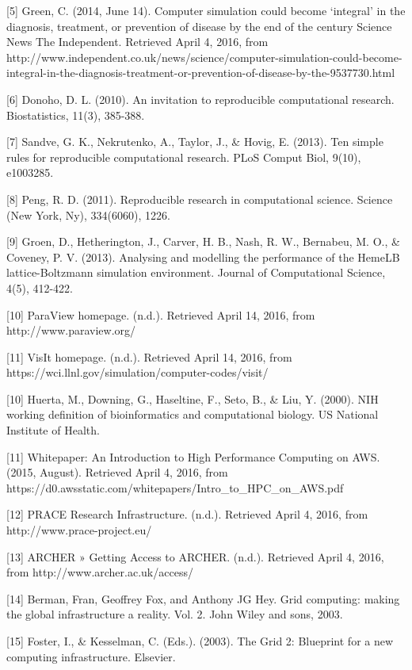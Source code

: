 \documentclass[]{article}
\begin{document}
{[}5{]} Green, C. (2014, June 14). Computer simulation could become
`integral' in the diagnosis, treatment, or prevention of disease by the
end of the century \textbar{} Science \textbar{} News \textbar{} The
Independent. Retrieved April 4, 2016, from
http://www.independent.co.uk/news/science/computer-simulation-could-become-integral-in-the-diagnosis-treatment-or-prevention-of-disease-by-the-9537730.html

{[}6{]} Donoho, D. L. (2010). An invitation to reproducible
computational research. Biostatistics, 11(3), 385-388.

{[}7{]} Sandve, G. K., Nekrutenko, A., Taylor, J., \& Hovig, E. (2013).
Ten simple rules for reproducible computational research. PLoS Comput
Biol, 9(10), e1003285.

{[}8{]} Peng, R. D. (2011). Reproducible research in computational
science. Science (New York, Ny), 334(6060), 1226.

{[}9{]} Groen, D., Hetherington, J., Carver, H. B., Nash, R. W.,
Bernabeu, M. O., \& Coveney, P. V. (2013). Analysing and modelling the
performance of the HemeLB lattice-Boltzmann simulation environment.
Journal of Computational Science, 4(5), 412-422.

{[}10{]} ParaView homepage. (n.d.). Retrieved April 14, 2016, from
http://www.paraview.org/

{[}11{]} VisIt homepage. (n.d.). Retrieved April 14, 2016, from
https://wci.llnl.gov/simulation/computer-codes/visit/

{[}10{]} Huerta, M., Downing, G., Haseltine, F., Seto, B., \& Liu, Y.
(2000). NIH working definition of bioinformatics and computational
biology. US National Institute of Health.

{[}11{]} Whitepaper: An Introduction to High Performance Computing on
AWS. (2015, August). Retrieved April 4, 2016, from
https://d0.awsstatic.com/whitepapers/Intro\_to\_HPC\_on\_AWS.pdf

{[}12{]} PRACE Research Infrastructure. (n.d.). Retrieved April 4, 2016,
from http://www.prace-project.eu/

{[}13{]} ARCHER » Getting Access to ARCHER. (n.d.). Retrieved April 4,
2016, from http://www.archer.ac.uk/access/

{[}14{]} Berman, Fran, Geoffrey Fox, and Anthony JG Hey. Grid computing:
making the global infrastructure a reality. Vol. 2. John Wiley and sons,
2003.

{[}15{]} Foster, I., \& Kesselman, C. (Eds.). (2003). The Grid 2:
Blueprint for a new computing infrastructure. Elsevier.
\end{document}
